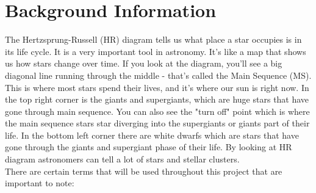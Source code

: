 \documentclass[12pt]{article}
\begin{document}
\section{Background Information}
The Hertzsprung-Russell (HR) diagram tells us what place a star occupies is in its life cycle. It is a very important tool in astronomy. It's like a map that shows us how stars change over time. If you look at the diagram, you'll see a big diagonal line running through the middle - that's called the Main Sequence (MS). This is where most stars spend their lives, and it's where our sun is right now. In the top right corner is the giants and supergiants, which are huge stars that have gone through main sequence. You can also see the "turn off" point which is where the main sequence stars star diverging into the supergiants or giants part of their life. In the bottom left corner there are white dwarfs which are stars that have gone through the giants and supergiant phase of their life. By looking at HR diagram astronomers can tell a lot of stars and stellar clusters.
\newline
\\There are certain terms that will be used throughout this project that are important to note:
\end{document}

